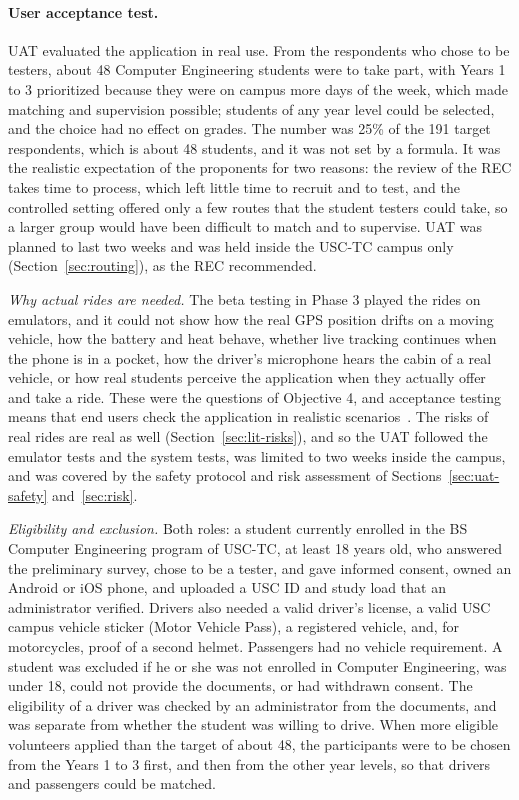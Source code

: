 \paragraph{User acceptance test.}\label{sec:uat-test}
UAT evaluated the application in real use. From the respondents who chose to be testers, about 48 Computer Engineering students were to take part, with Years 1 to 3 prioritized because they were on campus more days of the week, which made matching and supervision possible; students of any year level could be selected, and the choice had no effect on grades. The number was 25\% of the 191 target respondents, which is about 48 students, and it was not set by a formula. It was the realistic expectation of the proponents for two reasons: the review of the REC takes time to process, which left little time to recruit and to test, and the controlled setting offered only a few routes that the student testers could take, so a larger group would have been difficult to match and to supervise. UAT was planned to last two weeks and was held inside the USC-TC campus only (Section~\ref{sec:routing}), as the REC recommended.

\textit{Why actual rides are needed.} The beta testing in Phase 3 played the rides on emulators, and it could not show how the real GPS position drifts on a moving vehicle, how the battery and heat behave, whether live tracking continues when the phone is in a pocket, how the driver's microphone hears the cabin of a real vehicle, or how real students perceive the application when they actually offer and take a ride. These were the questions of Objective 4, and acceptance testing means that end users check the application in realistic scenarios~\cite{gfgacceptance}. The risks of real rides are real as well (Section~\ref{sec:lit-risks}), and so the UAT followed the emulator tests and the system tests, was limited to two weeks inside the campus, and was covered by the safety protocol and risk assessment of Sections~\ref{sec:uat-safety} and~\ref{sec:risk}.

\textit{Eligibility and exclusion.} Both roles: a student currently enrolled in the BS Computer Engineering program of USC-TC, at least 18 years old, who answered the preliminary survey, chose to be a tester, and gave informed consent, owned an Android or iOS phone, and uploaded a USC ID and study load that an administrator verified. Drivers also needed a valid driver's license, a valid USC campus vehicle sticker (Motor Vehicle Pass), a registered vehicle, and, for motorcycles, proof of a second helmet. Passengers had no vehicle requirement. A student was excluded if he or she was not enrolled in Computer Engineering, was under 18, could not provide the documents, or had withdrawn consent. The eligibility of a driver was checked by an administrator from the documents, and was separate from whether the student was willing to drive. When more eligible volunteers applied than the target of about 48, the participants were to be chosen from the Years 1 to 3 first, and then from the other year levels, so that drivers and passengers could be matched.

